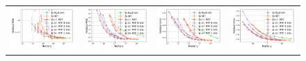 \begin{figure}
	\centering
	\begin{tabular}{c@{\hskip 0in}c@{\hskip 0in}c@{\hskip 0in}c}
		\includegraphics[width=0.3\linewidth]{figures/census_MSE_vs_n_memory_all_line.pdf} &
		\includegraphics[width=0.3\linewidth]{figures/yearpred_MSE_vs_n_memory_all_line.pdf} &
		\includegraphics[width=0.3\linewidth]{figures/covtype_error_vs_n_memory_all_line.pdf} &
		\includegraphics[width=0.3\linewidth]{figures/timit_error_vs_n_memory_all_line.pdf} \\

\end{tabular}
\end{figure}
